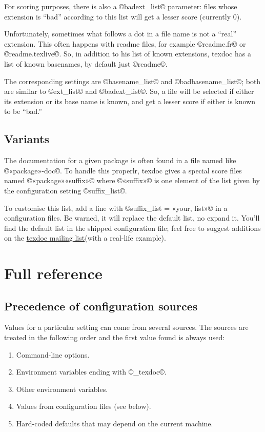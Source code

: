 \documentclass[a4paper, oneside]{scrartcl}
\makeatletter
\newcommand\tdml{\href{mailto:texdoc@tug.org}{texdoc mailing list}\xspace}
\makeatother
\begin{document}
For scoring purposes, there is also a ©badext_list© parameter: files whose
extension is ``bad'' according to this list will get a lesser score (currently
0).

Unfortunately, sometimes what follows a dot in a file name is not a ``real''
extension. This often happens with readme files, for example ©readme.fr© or
©readme.texlive©. So, in addition to his list of known extensions, texdoc has
a list of known basenames, by default just ©readme©.

The corresponding settings are ©basename_list© and ©badbasename_list©; both
are similar to ©ext_list© and ©badext_list©. So, a file will be selected if
either its extension or its base name is known, and get a lesser score if
either is known to be ``bad.''

\subsection{Variants}\label{ss-variants}

The documentation for a given package is often found in a file named like
©«package»-doc©. To handle this properlr, texdoc gives a special score files
named ©«package»«suffix»© where ©«suffix»© is one element of the list given by
the configuration setting ©suffix_list©.

To customise this list, add a line with ©suffix_list = «your, list»© in a
configuration files. Be warned, it will replace the default list, no expand
it. You'll find the default list in the shipped configuration file; feel free
to suggest additions on the \tdml (with a real-life example).

\clearpage

\section{Full reference}

\subsection{Precedence of configuration sources}\label{ss-prec}

Values for a particular setting can come from several sources. The sources are
treated in the following order and the first value found is always used:
\begin{enumerate}
  \item Command-line options.
  \item Environment variables ending with ©_texdoc©.
  \item Other environment variables.
  \item Values from configuration files (see below).
  \item Hard-coded defaults that may depend on the current machine.
\end{enumerate}
\end{document}
